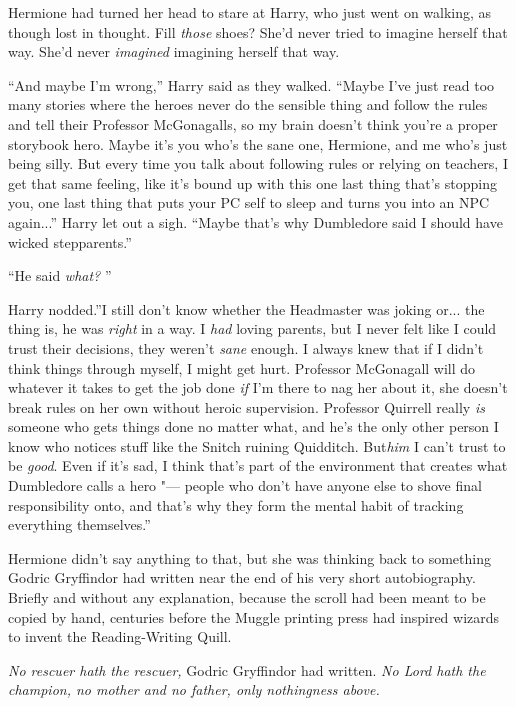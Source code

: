 Hermione had turned her head to stare at Harry, who just went on
walking, as though lost in thought. Fill \emph{those} shoes? She'd never
tried to imagine herself that way. She'd never \emph{imagined} imagining
herself that way.

``And maybe I'm wrong,'' Harry said as they walked. ``Maybe I've just
read too many stories where the heroes never do the sensible thing and
follow the rules and tell their Professor McGonagalls, so my brain
doesn't think you're a proper storybook hero. Maybe it's you who's the
sane one, Hermione, and me who's just being silly. But every time you
talk about following rules or relying on teachers, I get that same
feeling, like it's bound up with this one last thing that's stopping
you, one last thing that puts your PC self to sleep and turns you into
an NPC again...'' Harry let out a sigh. ``Maybe that's why
Dumbledore said I should have wicked stepparents.''

``He said \emph{what?} ''

Harry nodded.''I still don't know whether the Headmaster was joking
or... the thing is, he was \emph{right} in a way. I \emph{had}
loving parents, but I never felt like I could trust their decisions,
they weren't \emph{sane} enough. I always knew that if I didn't think
things through myself, I might get hurt. Professor McGonagall will do
whatever it takes to get the job done \emph{if} I'm there to nag her
about it, she doesn't break rules on her own without heroic supervision.
Professor Quirrell really \emph{is} someone who gets things done no
matter what, and he's the only other person I know who notices stuff
like the Snitch ruining Quidditch. But\emph{him} I can't trust to be
\emph{good}. Even if it's sad, I think that's part of the environment
that creates what Dumbledore calls a hero "--- people who don't have anyone
else to shove final responsibility onto, and that's why they form the
mental habit of tracking everything themselves.''

Hermione didn't say anything to that, but she was thinking back to
something Godric Gryffindor had written near the end of his very short
autobiography. Briefly and without any explanation, because the scroll
had been meant to be copied by hand, centuries before the Muggle
printing press had inspired wizards to invent the Reading-Writing Quill.

\emph{No rescuer hath the rescuer,} Godric Gryffindor had written.
\emph{No Lord hath the champion, no mother and no father, only
nothingness above.}

